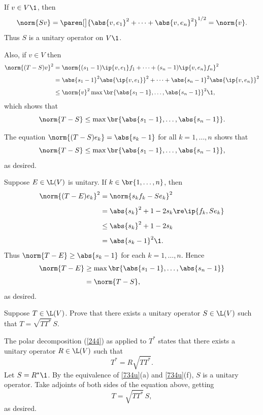 \begin{Solution}
\begin{subtheorem}
\item
If $v \in V\1$, then
\[
\norm{Sv} = \paren[\big]{\abs{v, e_1}^2 + \cdots + \abs{v, e_n}^2 }^{1/2} = \norm{v}.
\]
Thus $S$ is a unitary operator on $V\1$.

Also, if $v \in V$ then
\begin{align*}
\norm{(T-S)v}^2 &= \norm{ (s_1 -1) \ip{v, e_1} f_1 + \cdots + (s_n -1) \ip{v, e_n} f_n }^2 \\[3bp]
&= \abs{s_1 -1}^2 \abs{\ip{v, e_1}}^2 + \cdots + \abs{s_n -1}^2 \abs{\ip{v, e_n}}^2 \\[3bp]
&\le \norm{v}^2 \max \br{ \abs{s_1 -1}, \ldots, \abs{s_n - 1} }^2\1,
\end{align*}
which shows that
\[
\norm{T-S} \le \max \br{ \abs{s_1 -1}, \ldots, \abs{s_n - 1} }.
\]

The equation $\norm{(T-S)e_k} = \abs{s_k - 1}$ for all $k = 1, \ldots, n$ shows that
\[
\norm{T-S} \le \max \br{ \abs{s_1 -1}, \ldots, \abs{s_n - 1} },
\]
as desired.

\item
Suppose $E \in \L(V)$ is unitary. If $k \in \br{1, \ldots, n}$, then
\begin{align*}
\norm{(T-E)e_k}^2 & = \norm{s_k f_k - Se_k}^2 \\[4bp]
&= \abs{s_k}^2 + 1 - 2 s_k \re \ip{f_k, Se_k} \\[4bp]
&\le \abs{s_k}^2 + 1 - 2 s_k \\[4bp]
&= \abs{s_k -1}^2\1.
\end{align*}
Thus $\norm{T-E} \ge \abs{s_k - 1}$ for each $k = 1, \ldots, n$. Hence
\begin{align*}
\norm{T-E} &\ge \max \br{ \abs{s_1 -1}, \ldots, \abs{s_n - 1} } \\[4bp]
&= \norm{T-S},
\end{align*}
as desired.
\end{subtheorem}
\end{Solution}

\exercise
Suppose $T \in \L(V)$. Prove that there exists a unitary operator $S \in \L(V)$ such that
$
T = \sqrt{TT^*}\, S$.

\begin{Solution}
The polar decomposition (\ref{244}) as applied to $T^*$ states that there exists a unitary operator $R \in \L(V)$ such that
\[
T^* = R \sqrt{TT^*}.
\]
Let $S = R^*\1$. By the equivalence of \ref{734u}(a) and \ref{734u}(f), $S$ is a unitary operator. Take adjoints of both sides of the equation above, getting
\[
T = \sqrt{TT^*}\, S,
\]
as desired.
\end{Solution}

